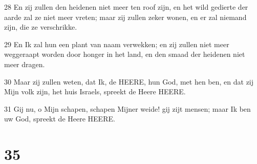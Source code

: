 \par 28 En zij zullen den heidenen niet meer ten roof zijn, en het wild gedierte der aarde zal ze niet meer vreten; maar zij zullen zeker wonen, en er zal niemand zijn, die ze verschrikke.
\par 29 En Ik zal hun een plant van naam verwekken; en zij zullen niet meer weggeraapt worden door honger in het land, en den smaad der heidenen niet meer dragen.
\par 30 Maar zij zullen weten, dat Ik, de HEERE, hun God, met hen ben, en dat zij Mijn volk zijn, het huis Israels, spreekt de Heere HEERE.
\par 31 Gij nu, o Mijn schapen, schapen Mijner weide! gij zijt mensen; maar Ik ben uw God, spreekt de Heere HEERE.

\chapter{35}

